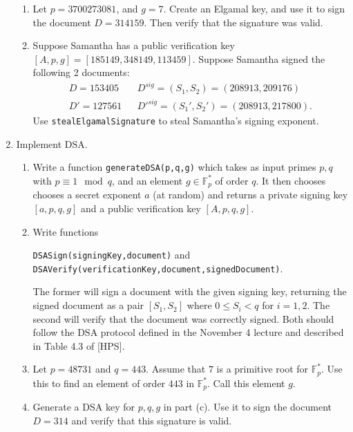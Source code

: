 \documentclass[11pt]{article}
\newcommand{\bF}{\mathbb{F}}
\begin{document}
\begin{enumerate}
{\begin{enumerate}
{    \begin{center}
      \verb|stealElgamalSignature(verificationKey,D,Dsig,D',D'sig)|.
    \end{center}
    which takes as input verification key associated to an Elgamal signature (which is public information), as well as 2 distinct documents signed with that key.  It will first check if those 2 documents were signed with the same random value $k$, and if they were it will return the signers secret exponent $a$.  (This attack was used to steal Sony's digital signature in 2013!).
    }
    \item{
    Let $p=3700273081$, and $g=7$.  Create an Elgamal key, and use it to sign the document $D = 314159$.  Then verify that the signature was valid.
    }
    \item{
    Suppose Samantha has a public verification key $[A,p,g] = [185149,348149,113459]$.  Suppose Samantha signed the following 2 documents:
    \begin{eqnarray*}
      D = 153405 && D^{sig} = (S_1,S_2) = (208913,209176)\\
      D' = 127561 && D'^{sig} = (S_1',S_2') = (208913,217800).
    \end{eqnarray*}
    Use \verb|stealElgamalSignature| to steal Samantha's signing exponent.
    }
  \end{enumerate}
  }
  \item{
  Implement DSA.
  \begin{enumerate}
    \item{
    Write a function \verb|generateDSA(p,q,g)| which takes as input primes $p,q$ with $p\equiv 1\mod q$, and an element $g\in\bF_p^*$ of order $q$.   It then chooses chooses a secret exponent $a$ (at random) and returns a private signing key $[a,p,q,g]$ and a public verification key $[A,p,q,g]$.
    }
    \item{
    Write functions \begin{center}\verb|DSASign(signingKey,document)| and \verb|DSAVerify(verificationKey,document,signedDocument)|.\end{center}
    The former will sign a document with the given signing key, returning the signed document as a pair $[S_1,S_2]$ where $0\le S_i<q$ for $i=1,2$.  The second will verify that the document was correctly signed.  Both should follow the DSA protocol defined in the November 4 lecture and described in Table 4.3 of [HPS].
    }
    \item{
    Let $p = 48731$ and $q = 443$.  Assume that $7$ is a primitive root for $\bF_p^*$.  Use this to find an element of order $443$ in $\bF_p^*$.  Call this element $g$.
    }
    \item{
    Generate a DSA key for $p,q,g$ in part (c).  Use it to sign the document $D = 314$ and verify that this signature is valid.
    }
  \end{enumerate}
  }
\end{enumerate}
\end{document}
